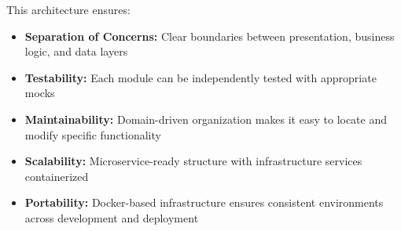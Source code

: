 This architecture ensures:
\begin{itemize}
    \item \textbf{Separation of Concerns:} Clear boundaries between presentation, business logic, and data layers
    \item \textbf{Testability:} Each module can be independently tested with appropriate mocks
    \item \textbf{Maintainability:} Domain-driven organization makes it easy to locate and modify specific functionality
    \item \textbf{Scalability:} Microservice-ready structure with infrastructure services containerized
    \item \textbf{Portability:} Docker-based infrastructure ensures consistent environments across development and deployment
\end{itemize}
